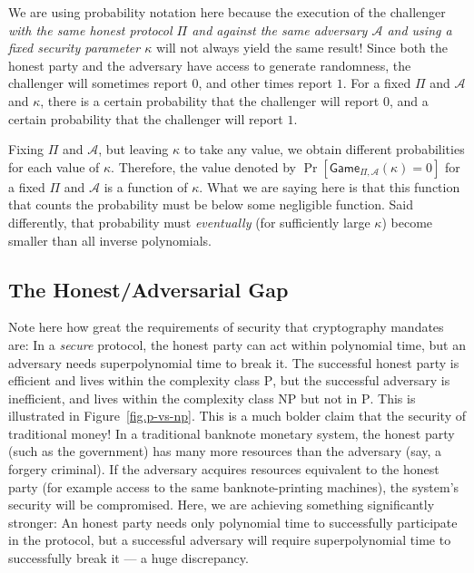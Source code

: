 We are using probability notation here because the execution of the challenger \emph{with the
same honest protocol $\Pi$ and against the same adversary $\mathcal{A}$ and using a fixed security parameter
$\kappa$} will not always yield
the same result! Since both the honest party and the adversary have access to generate randomness,
the challenger will sometimes report $0$, and other times report $1$. For a fixed $\Pi$ and $\mathcal{A}$
and $\kappa$, there is a certain probability that the challenger will report $0$, and a certain
probability that the challenger will report $1$.

Fixing $\Pi$ and $\mathcal{A}$, but leaving $\kappa$
to take any value, we obtain different probabilities for each value of $\kappa$. Therefore,
the value denoted by $\Pr[\textsf{Game}_{\Pi,\mathcal{A}}(\kappa) = 0]$ for a fixed $\Pi$ and
$\mathcal{A}$ is a function of $\kappa$. What we are saying here is that this function that
counts the probability must be below some negligible function. Said differently, that probability
must \emph{eventually} (for sufficiently large $\kappa$) become smaller than all inverse polynomials.

\subsection*{The Honest/Adversarial Gap}

Note here how great the requirements of security that cryptography mandates are:
In a \emph{secure} protocol, the honest party can act within polynomial time,
but an adversary needs superpolynomial time to break it. The successful honest party
is efficient and lives within the
complexity class \textsc{P}, but the successful adversary is inefficient, and
lives within the complexity class \textsc{NP} but not in \textsc{P}. This is
illustrated in Figure~\ref{fig.p-vs-np}. This is a much bolder claim that the
security of traditional money! In a traditional banknote monetary system, the honest party
(such as the government) has many more resources than the adversary (say, a forgery
criminal). If the adversary acquires resources equivalent to the honest party (for example
access to the same banknote-printing machines), the system's security will be
compromised. Here, we are achieving something significantly stronger: An honest
party needs only polynomial time to successfully participate in the protocol,
but a successful adversary will require superpolynomial time to successfully break it
--- a huge discrepancy.

